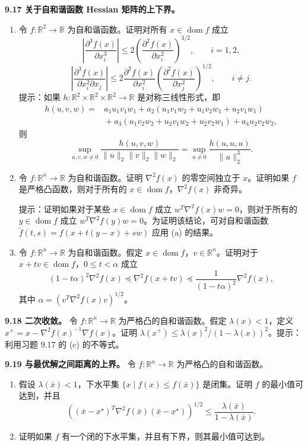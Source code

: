 \documentclass[UTF8,12pt,a4paper,fontset=fandol]{ctexart}
\begin{document}
\noindent\textbf{9.17 关于自和谐函数 Hessian 矩阵的上下界。}
\begin{enumerate}
\item[(a)] 令 $f:\mathbb{R}^2\to\mathbb{R}$ 为自和谐函数。证明对所有 $x\in\operatorname{dom} f$ 成立
\[
\left|\frac{\partial^3 f(x)}{\partial x_i^3}\right|\leq2\left(\frac{\partial^2 f(x)}{\partial x_i^2}\right)^{3/2},
\qquad i=1,2,
\]
\[
\left|\frac{\partial^3 f(x)}{\partial x_i^2\partial x_j}\right|\leq
2\frac{\partial^2 f(x)}{\partial x_i^2}\left(\frac{\partial^2 f(x)}{\partial x_j^2}\right)^{1/2},
\qquad i\neq j.
\]
提示：如果 $h:\mathbb{R}^2\times\mathbb{R}^2\times\mathbb{R}^2\to\mathbb{R}$ 是对称三线性形式，即
\[
\begin{aligned}
h(u,v,w)={}&a_1u_1v_1w_1+a_2(u_1v_1w_2+u_1v_2w_1+u_2v_1w_1)\\
&{}+a_3(u_1v_2w_2+u_2v_1w_2+u_2v_2w_1)+a_4u_2v_2w_2,
\end{aligned}
\]
则
\[
\sup_{u,v,w\neq0}\frac{h(u,v,w)}{\|u\|_2\|v\|_2\|w\|_2}
=\sup_{u\neq0}\frac{h(u,u,u)}{\|u\|_2^3}.
\]
\item[(b)] 令 $f:\mathbb{R}^n\to\mathbb{R}$ 为自和谐函数。证明 $\nabla^2 f(x)$ 的零空间独立于 $x$。证明如果 $f$ 是严格凸函数，则对于所有的 $x\in\operatorname{dom} f$，$\nabla^2 f(x)$ 非奇异。

提示：证明如果对于某些 $x\in\operatorname{dom} f$ 成立 $w^T\nabla^2 f(x)w=0$，则对于所有的 $y\in\operatorname{dom} f$ 成立 $w^T\nabla^2 f(y)w=0$。为证明该结论，可对自和谐函数 $\tilde f(t,s)=f(x+t(y-x)+sw)$ 应用 (a) 的结果。
\item[(c)] 令 $f:\mathbb{R}^n\to\mathbb{R}$ 为自和谐函数。假定 $x\in\operatorname{dom} f$，$v\in\mathbb{R}^n$。证明对于 $x+tv\in\operatorname{dom} f$，$0\leq t<\alpha$ 成立
\[
(1-t\alpha)^2\nabla^2 f(x)\preceq\nabla^2 f(x+tv)\preceq
\frac{1}{(1-t\alpha)^2}\nabla^2 f(x),
\]
其中 $\alpha=(v^T\nabla^2 f(x)v)^{1/2}$。
\end{enumerate}

\noindent\textbf{9.18 二次收敛。}\quad
令 $f:\mathbb{R}^n\to\mathbb{R}$ 为严格凸的自和谐函数。假定 $\lambda(x)<1$，定义 $x^+=x-\nabla^2 f(x)^{-1}\nabla f(x)$。证明 $\lambda(x^+)\leq\lambda(x)^2/(1-\lambda(x))^2$。提示：利用习题 9.17 的 (c) 的不等式。

\noindent\textbf{9.19 与最优解之间距离的上界。}\quad
令 $f:\mathbb{R}^n\to\mathbb{R}$ 为严格凸的自和谐函数。
\begin{enumerate}
\item[(a)] 假设 $\lambda(\bar x)<1$，下水平集 $\{x\mid f(x)\leq f(\bar x)\}$ 是闭集。证明 $f$ 的最小值可达到，并且
\[
\left((\bar x-x^\star)^T\nabla^2 f(\bar x)(\bar x-x^\star)\right)^{1/2}
\leq\frac{\lambda(\bar x)}{1-\lambda(\bar x)}.
\]
\item[(b)] 证明如果 $f$ 有一个闭的下水平集，并且有下界，则其最小值可达到。
\end{enumerate}
\end{document}
